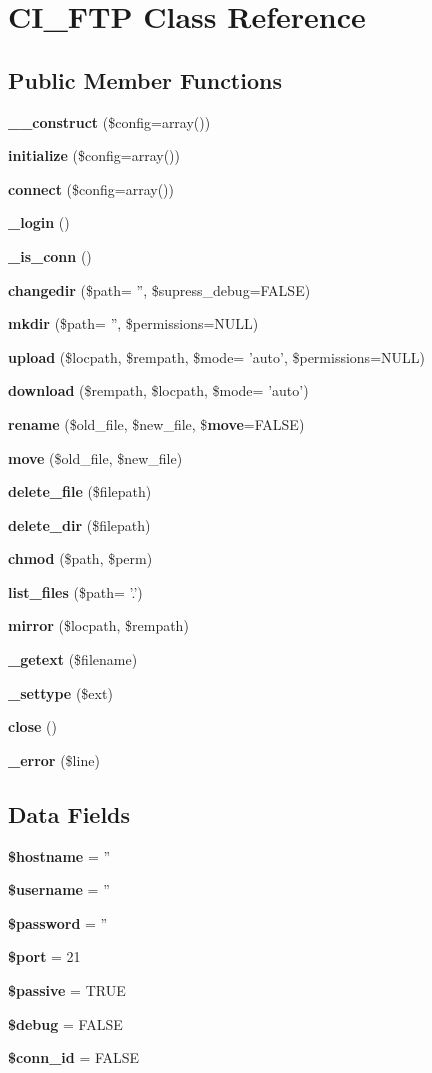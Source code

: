 \section{C\-I\-\_\-\-F\-T\-P Class Reference}
\label{class_c_i___f_t_p}
\subsection*{Public Member Functions}
\begin{DoxyCompactItemize}
\item 
{\bf \-\_\-\-\_\-construct} (\$config=array())
\item 
{\bf initialize} (\$config=array())
\item 
{\bf connect} (\$config=array())
\item 
{\bf \-\_\-login} ()
\item 
{\bf \-\_\-is\-\_\-conn} ()
\item 
{\bf changedir} (\$path= '', \$supress\-\_\-debug=F\-A\-L\-S\-E)
\item 
{\bf mkdir} (\$path= '', \$permissions=N\-U\-L\-L)
\item 
{\bf upload} (\$locpath, \$rempath, \$mode= 'auto', \$permissions=N\-U\-L\-L)
\item 
{\bf download} (\$rempath, \$locpath, \$mode= 'auto')
\item 
{\bf rename} (\$old\-\_\-file, \$new\-\_\-file, \${\bf move}=F\-A\-L\-S\-E)
\item 
{\bf move} (\$old\-\_\-file, \$new\-\_\-file)
\item 
{\bf delete\-\_\-file} (\$filepath)
\item 
{\bf delete\-\_\-dir} (\$filepath)
\item 
{\bf chmod} (\$path, \$perm)
\item 
{\bf list\-\_\-files} (\$path= '.')
\item 
{\bf mirror} (\$locpath, \$rempath)
\item 
{\bf \-\_\-getext} (\$filename)
\item 
{\bf \-\_\-settype} (\$ext)
\item 
{\bf close} ()
\item 
{\bf \-\_\-error} (\$line)
\end{DoxyCompactItemize}
\subsection*{Data Fields}
\begin{DoxyCompactItemize}
\item 
{\bf \$hostname} = ''
\item 
{\bf \$username} = ''
\item 
{\bf \$password} = ''
\item 
{\bf \$port} = 21
\item 
{\bf \$passive} = T\-R\-U\-E
\item 
{\bf \$debug} = F\-A\-L\-S\-E
\item 
{\bf \$conn\-\_\-id} = F\-A\-L\-S\-E
\end{DoxyCompactItemize}


